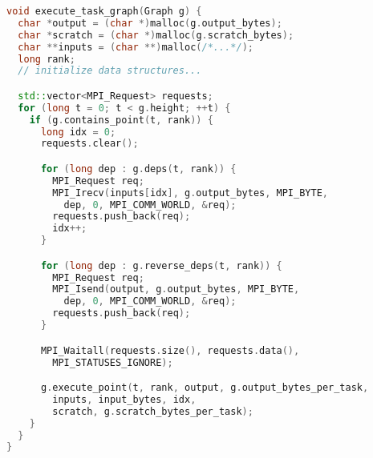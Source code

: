 \begin{lstlisting}[language=C++,caption={Excerpt from Task Bench implementation in MPI.},label={lst:code-sample},style=codeblock,float]
void execute_task_graph(Graph g) {
  char *output = (char *)malloc(g.output_bytes);
  char *scratch = (char *)malloc(g.scratch_bytes);
  char **inputs = (char **)malloc(/*...*/);
  long rank;
  // initialize data structures...

  std::vector<MPI_Request> requests;
  for (long t = 0; t < g.height; ++t) {
    if (g.contains_point(t, rank)) {
      long idx = 0;
      requests.clear();

      for (long dep : g.deps(t, rank)) {
        MPI_Request req;
        MPI_Irecv(inputs[idx], g.output_bytes, MPI_BYTE,
          dep, 0, MPI_COMM_WORLD, &req);
        requests.push_back(req);
        idx++;
      }

      for (long dep : g.reverse_deps(t, rank)) {
        MPI_Request req;
        MPI_Isend(output, g.output_bytes, MPI_BYTE,
          dep, 0, MPI_COMM_WORLD, &req);
        requests.push_back(req);
      }

      MPI_Waitall(requests.size(), requests.data(),
        MPI_STATUSES_IGNORE);

      g.execute_point(t, rank, output, g.output_bytes_per_task,
        inputs, input_bytes, idx,
        scratch, g.scratch_bytes_per_task);
    }
  }
}
\end{lstlisting}
